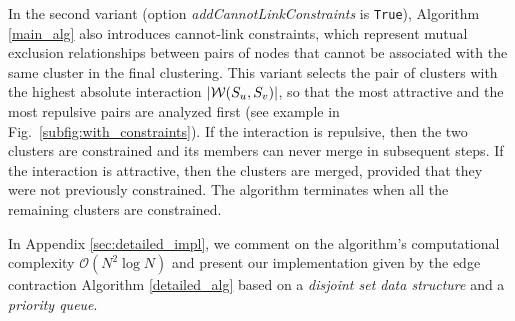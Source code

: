 In the second variant (option \emph{addCannotLinkConstraints} is \texttt{True}), Algorithm \ref{main_alg} also introduces cannot-link constraints, which represent mutual exclusion relationships between pairs of nodes that cannot be associated with the same cluster in the final clustering. This variant 
selects the pair of clusters with the highest absolute interaction $|\mathcal{W}(S_u, S_v)|$, so that the most attractive and the most repulsive pairs are analyzed first (see example in Fig.\ \ref{subfig:with_constraints}). If the interaction is repulsive, then the two clusters are constrained and its members can never merge in subsequent steps. If the interaction is attractive, then the clusters are merged, provided that they were not previously constrained. 
The algorithm terminates when all the remaining clusters are constrained.

In Appendix \ref{sec:detailed_impl}, we comment on the algorithm's computational complexity $\mathcal{O}(N^2 \log N)$ and present our implementation given by the edge contraction Algorithm \ref{detailed_alg} based on a \emph{disjoint set data structure} and a \emph{priority queue}.

